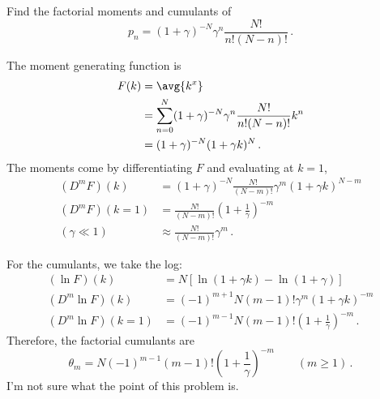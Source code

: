 

Find the factorial moments and cumulants of
\begin{equation*}
p_n = (1 + \gamma)^{-N} \gamma^n \frac{N!}{n!(N-n)!} \, .
\end{equation*}


The moment generating function is
\begin{align*}
F(k)
&= \avg{k^x} \\
&= \sum_{n=0}^N (1 + \gamma)^{-N} \gamma^n \frac{N!}{n!(N-n)!} k^n \\
&= (1 + \gamma)^{-N} (1 + \gamma k)^N \, .
\end{align*}
The moments come by differentiating $F$ and evaluating at $k=1$,
\begin{align*}
(D^m F)(k)
&= (1 + \gamma)^{-N} \frac{N!}{(N-m)!} \gamma^m (1 + \gamma k)^{N-m} \\
(D^m F)(k=1)
&= \frac{N!}{(N-m)!} \left(1 + \frac{1}{\gamma} \right)^{-m} \\
(\gamma \ll 1) \qquad
&\approx \frac{N!}{(N - m)!} \gamma^m \, .
\end{align*}

For the cumulants, we take the log:
\begin{align*}
(\ln F)(k)
&= N \left[ \ln(1 + \gamma k) - \ln(1 + \gamma) \right] \\
(D^m \ln F)(k)
&=  (-1)^{m+1} N(m-1)! \gamma^m (1 + \gamma k)^{-m} \\
(D^m \ln F)(k=1)
&=  (-1)^{m-1} N(m-1)! \left( 1 + \frac{1}{\gamma} \right)^{-m} \, .
\end{align*}
Therefore, the factorial cumulants are
\begin{equation*}
\theta_m = N (-1)^{m-1} (m-1)! \left( 1 + \frac{1}{\gamma} \right)^{-m} \qquad (m \geq 1) \, .
\end{equation*}
I'm not sure what the point of this problem is.
